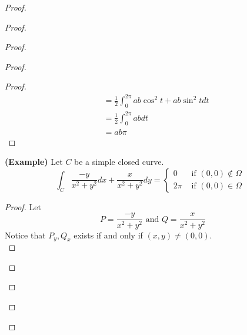 \documentclass{report}
\begin{document}
\begin{proof}
\begin{proof}
\begin{proof}
\begin{proof}
\begin{proof}
\begin{align}
&=\frac{1}{2}\int_0^{2\pi} ab\cos^2 t+ab \sin^2 tdt\\
&=\frac{1}{2}\int_0^{2\pi} abdt\\
&=ab\pi
\end{align}
\end{proof}
\begin{theorem}
\label{9.3.11}
\textbf{(Example)} Let $C$ be a simple closed curve.
\begin{equation*}
\int_C \frac{-y}{x^2+y^2}dx+\frac{x}{x^2+y^2} dy=\begin{cases}
  0& \text{ if  }(0,0)\not\in \Omega\\
  2\pi& \text{ if $(0,0)\in \Omega$ }
\end{cases}
\end{equation*}
\end{theorem}
\begin{proof}
Let 
\begin{equation*}
P=\frac{-y}{x^2+y^2}\text{ and }Q=\frac{x}{x^2+y^2}
\end{equation*}
Notice that $P_y,Q_x$ exists if and only if $(x,y)\neq (0,0)$.\\



\end{proof}
\end{proof}
\end{proof}
\end{proof}
\end{proof}
\end{document}
